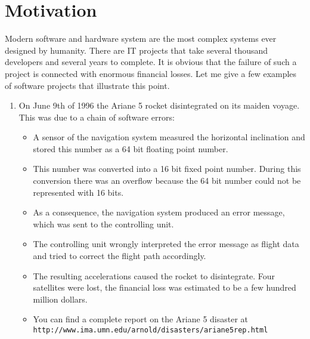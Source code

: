 \section{Motivation}
Modern software and hardware system are the most complex systems ever designed by humanity.
There are IT projects  that take several thousand developers and several years to complete.
It is obvious that the failure of such a project is connected with enormous financial losses.
Let me give a few examples of software projects that illustrate this point.
\begin{enumerate}
\item On June 9th of 1996 the Ariane 5 rocket disintegrated on its maiden voyage.
      This was due to a chain of software errors:
      \begin{itemize}
      \item A sensor of the navigation system measured the horizontal inclination and stored
            this number as a 64 bit floating point number.
      \item This number was converted into a 16 bit fixed point number.
            During this conversion there was an overflow because the 64 bit number could not be
            represented with 16 bits.
      \item As a consequence, the navigation system produced an error message, which was sent
            to the controlling unit.
      \item The controlling unit wrongly interpreted the error message as flight data and
            tried to correct the flight path accordingly.  
      \item The resulting accelerations caused the rocket to disintegrate.  
            Four satellites were lost, the financial loss
            was estimated to be a few hundred million dollars.

      \item You can find a complete report on the Ariane 5 disaster at \\[0.1cm]
      \hspace*{1.3cm} \texttt{http://www.ima.umn.edu/arnold/disasters/ariane5rep.html}
     

\end{itemize}
\end{enumerate}
